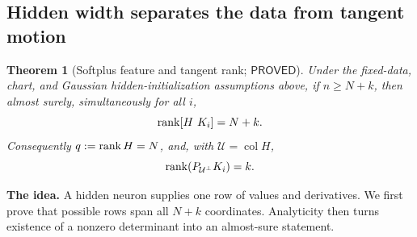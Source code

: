 \documentclass[12pt,a4paper]{article}
\theoremstyle{readable}
\newtheorem{theorem}{Theorem}[section]
\theoremstyle{definition}\newtheorem{example}[theorem]{Example}
\newcommand{\col}{\operatorname{col}}\newcommand{\row}{\operatorname{row}}
\newcommand{\PP}{\mathsf{PROVED}}\newcommand{\FF}{\mathsf{FALSE}}
\newcommand{\idea}[1]{\par\textbf{The idea.} #1\par}
\begin{document}
\subsection{Hidden width separates the data from tangent motion}
\begin{theorem}[Softplus feature and tangent rank; \(\PP\)]\label{thm:mlpfeatures}
Under the fixed-data, chart, and Gaussian hidden-initialization assumptions above, if \(n\ge N+k\), then almost surely, simultaneously for all \(i\),
\[
\operatorname{rank}[H\ K_i]=N+k.
\]
Consequently \(q:=\operatorname{rank} H=N\), and, with \(\mathcal U=\col H\),
\[
\operatorname{rank}(P_{\mathcal U^\perp}K_i)=k.
\]
\end{theorem}
\idea{A hidden neuron supplies one row of values and derivatives. We first prove that possible rows span all \(N+k\) coordinates. Analyticity then turns existence of a nonzero determinant into an almost-sure statement.}
\end{document}
